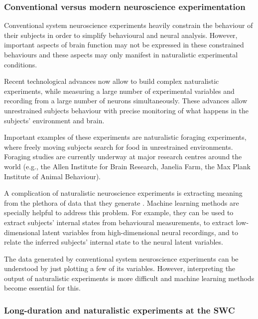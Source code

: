 \subsubsection*{Conventional versus modern neuroscience experimentation}

Conventional system neuroscience experiments heavily constrain the behaviour of
their subjects in order to simplify behavioural and neural analysis.  However,
important aspects of brain function may not be expressed in these constrained
behaviours and these aspects may only manifest in naturalistic experimental
conditions.


Recent technological advances now allow to build complex naturalistic
experiments, while measuring a large number of experimental variables and
recording from a large number of neurons simultaneously. These advances
allow unrestrained subjects behaviour with precise monitoring of what happens in
the subjects' environment and brain.

Important examples of these experiments are naturalistic foraging experiments,
where freely moving subjects search for food in unrestrained environments.
Foraging studies are currently underway at major research centres around the
world (e.g., the Allen Institute for Brain Research, Janelia Farm, the Max
Plank Institute of Animal Behaviour).

A complication of naturalistic neuroscience experiments is extracting meaning
from the plethora of data that they generate \citep{juavinett22}. Machine
learning methods are specially helpful to address this problem. For example,
they can be used to extract subjects' internal states from behavioural
measurements, to extract low-dimensional latent variables from high-dimensional
neural recordings, and to relate the inferred subjects' internal state to the
neural latent variables.

The data generated by conventional system neuroscience experiments can be
understood by just plotting a few of its variables. However, interpreting the output
of naturalistic experiments is more difficult and machine learning methods
become essential for this.

\subsubsection*{Long-duration and naturalistic experiments at the SWC}

